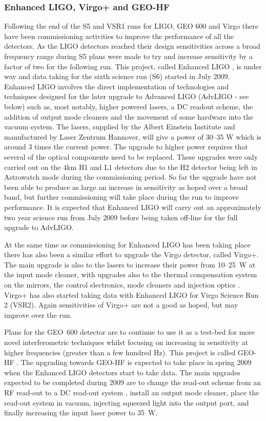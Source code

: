\documentclass{article}
\begin{document}
\subsubsection{Enhanced LIGO, Virgo+ and GEO-HF}\label{subsection:EnLIGO}
Following the end of the S5 and VSR1 runs for LIGO, GEO 600 and Virgo there
have been commissioning activities to improve the performance of all the
detectors. As the LIGO detectors reached their design sensitivities across a
broad frequency range during S5 plans were made to try and increase sensitivity
by a factor of two for the following run. This project, called Enhanced LIGO
\cite{EnhancedLIGO}, is under way and data taking for the sixth science run (S6)
started in July 2009. Enhanced LIGO involves the direct implementation of
technologies and techniques designed for the later upgrade to Advanced LIGO
(AdvLIGO - see below) such as, most notably, higher powered lasers, a DC readout
scheme, the addition of output mode cleaners and the movement of some hardware
into the vacuum system. The lasers, supplied by the Albert Einstein Institute
and manufactured by Laser Zentrum Hannover, will give a power of 30--35 W which
is around 3 times the current power. The upgrade to higher power requires that
several of the optical components need to be replaced. These upgrades were only
carried out on the 4km H1 and L1 detectors due to the H2 detector being
left in Astrowatch mode during the commissioning period. So far the upgrade have
not been able to produce as large an increase in sensitivity as hoped over a
broad band, but further commissioning will take place during the run to improve
performance. It is expected that Enhanced LIGO will carry out an approximately
two year science run from July 2009 before being taken off-line for the full
upgrade to AdvLIGO.

At the same time as commissioning for Enhanced LIGO has been taking place there
has also been a similar effort to upgrade the Virgo detector, called Virgo+.
The main upgrade is also to the lasers to increase their power from 10--25~W at
the input mode cleaner, with upgrades also to the thermal compensation system
on the mirrors, the control electronics, mode cleaners and injection optics
\cite{Acernese:2008b, AdVwhitepaper}. Virgo+ has also started taking data with
Enhanced LIGO for Virgo Science Run 2 (VSR2). Again sensitivities of Virgo+ are
not a good as hoped, but may improve over the run.

Plans for the GEO~600 detector are to continue to use it as a test-bed for more
novel interferometric techniques whilst focusing on increasing in sensitivity
at higher frequencies (greater than a few hundred Hz). This project is called
GEO-HF \cite{Willke:2006}. The upgrading towards GEO-HF is expected to take
place in spring 2009 when the Enhanced LIGO detectors start to take data. The
main upgrades expected to be completed during 2009 are to change the read-out
scheme from an RF read-out to a DC read-out system \cite{Hild:2008}, install an
output mode cleaner, place the read-out system in vacuum, injecting squeezed
light \cite{Vahlbruch:2008, Chelkowski:2007} into the output port, and finally
increasing the input laser power to 35~W.
\end{document}
